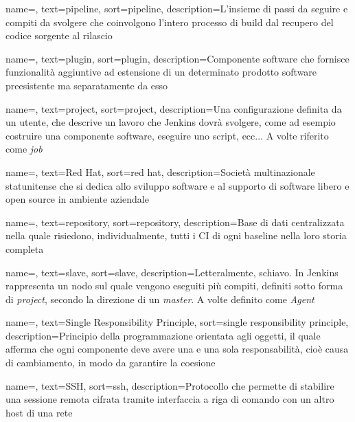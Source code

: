 {
    name=,
    text=pipeline,
    sort=pipeline,
    description={L'insieme di passi da seguire e compiti da svolgere che coinvolgono l'intero processo di build dal recupero del codice sorgente al rilascio}
}

{
    name=,
    text=plugin,
    sort=plugin,
    description={Componente software che fornisce funzionalità aggiuntive ad estensione di un determinato prodotto software preesistente ma separatamente da esso}
}

{
    name=,
    text=project,
    sort=project,
    description={Una configurazione definita da un utente, che descrive un lavoro che Jenkins dovrà svolgere, come ad esempio costruire una componente software, eseguire uno script, ecc... A volte riferito come \textit{job}}
}

{
    name=,
    text=Red Hat,
    sort=red hat,
    description={Società multinazionale statunitense che si dedica allo sviluppo software e al supporto di software libero e open source in ambiente aziendale}
}

{
    name=,
    text=repository,
    sort=repository,
    description={Base di dati centralizzata nella quale risiedono, individualmente, tutti i \gls{CI} di ogni \gls{baseline} nella loro storia completa}
}

{
    name=,
    text=slave,
    sort=slave,
    description={Letteralmente, schiavo. In Jenkins rappresenta un nodo sul quale vengono eseguiti più compiti, definiti sotto forma di \textit{project}, secondo la direzione di un \textit{master}. A volte definito come \textit{Agent}}
}

{
    name=,
    text=Single Responsibility Principle,
    sort=single responsibility principle,
    description={Principio della programmazione orientata agli oggetti, il quale afferma che ogni componente deve avere una e una sola responsabilità, cioè causa di cambiamento, in modo da garantire la coesione}
}

{
    name=,
    text=SSH,
    sort=ssh,
    description={Protocollo che permette di stabilire una sessione remota cifrata tramite interfaccia a riga di comando con un altro host di una rete}
}

